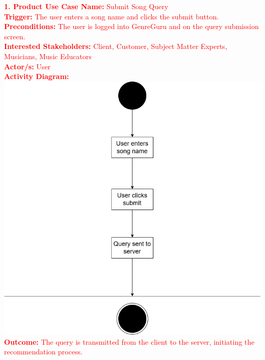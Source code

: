 \documentclass[12pt]{article}
\begin{document}
\noindent\textcolor{red}{\textbf{1. Product Use Case Name:} Submit Song Query} \\
\textcolor{red}{\textbf{Trigger:} The user enters a song name and clicks the submit button.} \\
\textcolor{red}{\textbf{Preconditions:} The user is logged into GenreGuru and on the query submission screen.} \\
\textcolor{red}{\textbf{Interested Stakeholders:} Client, Customer, Subject Matter Experts, Musicians, Music Educators} \\
\textcolor{red}{\textbf{Actor/s:} User} \\
\textcolor{red}{\textbf{Activity Diagram:}} \\
\includegraphics[width=\textwidth]{PUC1.drawio.png}
\textcolor{red}{\textbf{Outcome:} The query is transmitted from the client to the server, initiating the recommendation process.} \\

\vspace{1cm}
\end{document}
